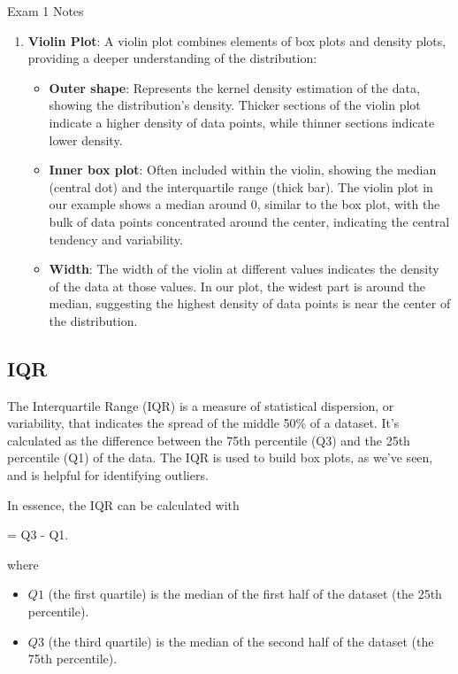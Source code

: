 \begin{examnotes}{Exam 1 Notes}
\begin{enumerate}
\begin{itemize}
        \end{itemize}
        \item \textbf{Violin Plot}: A violin plot combines elements of box plots and density plots, providing a deeper understanding of the distribution:
        \begin{itemize}
            \item \textbf{Outer shape}: Represents the kernel density estimation of the data, showing the distribution's density. Thicker sections of the violin plot indicate a higher density of data 
            points, while thinner sections indicate lower density.
            \item \textbf{Inner box plot}: Often included within the violin, showing the median (central dot) and the interquartile range (thick bar). The violin plot in our example shows a median 
            around 0, similar to the box plot, with the bulk of data points concentrated around the center, indicating the central tendency and variability.
            \item \textbf{Width}: The width of the violin at different values indicates the density of the data at those values. In our plot, the widest part is around the median, suggesting the highest 
            density of data points is near the center of the distribution.
        \end{itemize}
    \end{enumerate}

    \subsection*{IQR}

    The Interquartile Range (IQR) is a measure of statistical dispersion, or variability, that indicates the spread of the middle 50\% of a dataset. It's calculated as the difference between the 75th 
    percentile (Q3) and the 25th percentile (Q1) of the data. The IQR is used to build box plots, as we've seen, and is helpful for identifying outliers.

    In essence, the IQR can be calculated with

    \begin{center}
        \begin{highlightbox}
             = Q3 - Q1.
        \end{highlightbox}
    \end{center}
    where
    \begin{itemize}
        \item $Q1$ (the first quartile) is the median of the first half of the dataset (the 25th percentile).
        \item $Q3$ (the third quartile) is the median of the second half of the dataset (the 75th percentile).
    \end{itemize}


\end{examnotes}

